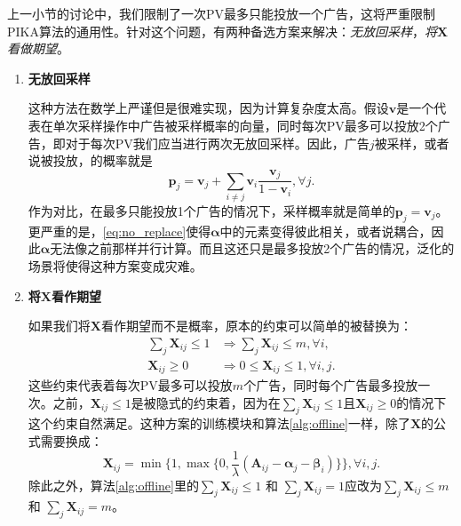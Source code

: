 上一小节的讨论中，我们限制了一次PV最多只能投放一个广告，这将严重限制PIKA算法的通用性。针对这个问题，有两种备选方案来解决：\textit{无放回采样}，\textit{将$\bm{X}$看做期望}。
\begin{enumerate}[1)]
	\item \textbf{无放回采样}
	
	这种方法在数学上严谨但是很难实现，因为计算复杂度太高。假设$\bm{v}$是一个代表在单次采样操作中广告被采样概率的向量，同时每次PV最多可以投放2个广告，即对于每次PV我们应当进行两次无放回采样。因此，广告$j$被采样，或者说被投放，的概率就是
	\begin{equation}
	\bm{p}_j = \bm{v}_j + \sum_{i \ne j}\bm{v}_i\frac{\bm{v}_j}{1 - \bm{v}_i}, \forall j.
	\label{eq:no_replace}
	\end{equation}
	作为对比，在最多只能投放1个广告的情况下，采样概率就是简单的$\bm{p}_j = \bm{v}_j$。更严重的是，\eqref{eq:no_replace}使得$\bm{\alpha}$中的元素变得彼此相关，或者说耦合，因此$\bm{\alpha}$无法像之前那样并行计算。而且这还只是最多投放2个广告的情况，泛化的场景将使得这种方案变成灾难。
	
	\item \textbf{将$\bm{X}$看作期望}
	
	如果我们将$\bm{X}$看作期望而不是概率，原本的约束可以简单的被替换为：
	\begin{equation}
	\begin{aligned}
	\sum_j{\bm{X}_{ij}} \le 1 &\Rightarrow \sum_j{\bm{X}_{ij}} \le m, \forall i, \\
	\bm{X}_{ij} \ge 0 &\Rightarrow 0 \le \bm{X}_{ij} \le 1, \forall i, j. 
	\end{aligned}
	\end{equation}
	这些约束代表着每次PV最多可以投放$m$个广告，同时每个广告最多投放一次。之前，$\bm{X}_{ij} \le 1$是被隐式的约束着，因为在$\sum_j{\bm{X}_{ij}} \le 1$且$\bm{X}_{ij} \ge 0$的情况下这个约束自然满足。这种方案的训练模块和算法\ref{alg:offline}一样，除了$\bm{X}$的公式需要换成：
	\begin{equation}
	\bm{X}_{ij} =\min\{1, \max\{0, \frac{1}{\lambda} (\bm{A}_{ij} - \bm{\alpha}_j - \bm{\beta}_i)\}\}, \forall i, j. 
	\end{equation}
	除此之外，算法\ref{alg:offline}里的$\sum_j{\bm{X}_{ij}} \le 1$ 和 $\sum_j{\bm{X}_{ij}} = 1$应改为$\sum_j{\bm{X}_{ij}} \le m$ 和 $\sum_j{\bm{X}_{ij}} = m$。
	

\end{enumerate}
